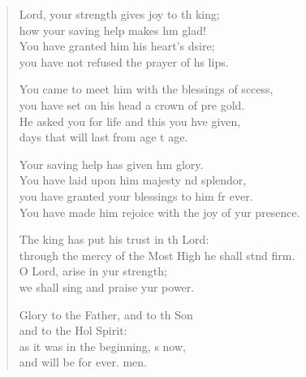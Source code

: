 \begin{verse}
  \begin{patverse}
 Lord, your strength gives joy to th king;\Med\\
how your saving help makes h\pointup{\i}m glad!\\
You have granted him his heart’s dsire;\Med\\
you have not refused the prayer of h\pointup{\i}s lips.

You came to meet him with the blessings of sccess,\Med\\
you have set on his head a crown of pre gold.\\
He asked you for life and this you hve given,\Med\\
days that will last from age t age.

Your saving help has given h\pointup{\i}m glory.\Med\\
You have laid upon him majesty nd splendor,\\
you have granted your blessings to him fr ever.\Med\\
You have made him rejoice with the joy of yur presence.

The king has put his trust in th Lord:\Med\\
through the mercy of the Most High he shall stnd firm.\\
O Lord, arise in yur strength;\Med\\
we shall sing and praise yur power.

Glory to the Father, and to th Son\Med\\
and to the Hol Spirit:\\
as it was in the beginning, \pointup{\i}s now,\Med\\
and will be for ever. men.
  \end{patverse}
\end{verse}
